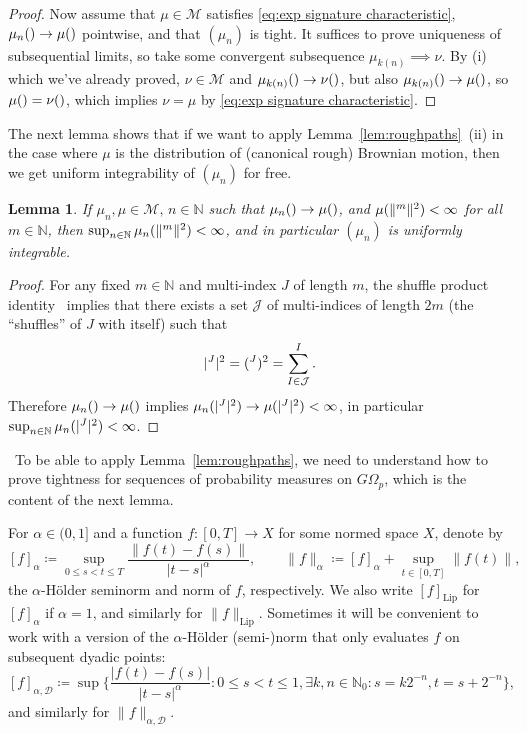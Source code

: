 \documentclass[11pt, letterpaper]{article}
\let\sig\relax
\DeclareMathOperator{\sig}{S}
\newtheorem{lemma}{Lemma}
\theoremstyle{definition}
\theoremstyle{remark}
\newcommand{\N}{\mathbb{N}}
\begin{document}
\begin{appendices}
\begin{proof}
    Now assume that $\mu\in \mathcal{M}$ satisfies \eqref{eq:exp signature characteristic}, $\mu_n(\sig) \to \mu(\sig)$ pointwise, and that $(\mu_n)$ is tight. It suffices to prove uniqueness of subsequential limits, so take some convergent subsequence $\mu_{k(n)} \implies \nu$. By (i) which we've already proved, $\nu\in \mathcal{M}$ and $\mu_{k(n)}(\sig) \to \nu(\sig)$, but also $\mu_{k(n)}(\sig) \to \mu(\sig)$, so $\mu(\sig) = \nu(\sig)$, which implies $\nu = \mu$ by \eqref{eq:exp signature characteristic}.
\end{proof}

The next lemma shows that if we want to apply Lemma~\ref{lem:roughpaths}~(ii) in the case where $\mu$ is the distribution of (canonical rough) Brownian motion, then we get uniform integrability of $(\mu_n)$ for free.
\begin{lemma}\label{lem: uniform integrability free}
    If $\mu_n,\mu \in \mathcal{M},\, n\in \N$ such that $\mu_n(\sig) \to \mu(\sig)$, and $\mu(\|\sig^m\|^2) < \infty$ for all $m\in \N$, then $\sup_{n\in \N} \mu_n(\|\sig^m\|^2) < \infty$, and in particular $(\mu_n)$ is uniformly integrable.
\end{lemma}
\begin{proof}
    For any fixed $m\in \N$ and multi-index $J$ of length $m$,
    the shuffle product identity~\cite[Theorem 2.15]{terrystflour} implies that there exists a set $\mathcal{J}$ of multi-indices of length $2m$ (the ``shuffles'' of $J$ with itself) such that \[
    |\sig^J|^2 = (\sig^J)^2 = \sum_{I \in \mathcal{J}} \sig^I.
    \] Therefore $\mu_n (\sig) \to \mu(\sig)$ implies $\mu_n(|\sig^J|^2) \to \mu(|\sig^J|^2) < \infty$, in particular $\sup_{n\in \N} \mu_n(|\sig^J|^2) < \infty$.
\end{proof}
\
To be able to apply Lemma~\ref{lem:roughpaths}, we need to understand how to prove tightness for sequences of probability measures on $G\Omega_p$, which is the content of the next lemma.

For $\alpha \in (0,1]$ and a function $f\colon [0,T] \to X$ for some normed space $X$, denote by \[
[f]_\alpha \coloneqq \sup_{0 \le s < t \le T} \frac{\|f(t) - f(s)\|}{|t-s|^\alpha},\qquad \|f\|_\alpha \coloneqq [f]_\alpha + \sup_{t\in [0,T]} \| f(t)\|,
\]
the $\alpha$-H\"older seminorm and norm of $f$, respectively. We also write $[f]_\text{Lip}$ for $[f]_\alpha$ if $\alpha = 1$, and similarly for $\|f\|_\text{Lip}$. Sometimes it will be convenient to work with a version of the $\alpha$-H\"older (semi-)norm that only evaluates $f$ on subsequent dyadic points: \[
    [f]_{\alpha,\mathcal{D}} \coloneqq \sup \bigg\{ \frac{|f(t)-f(s)|}{|t-s|^\alpha}\colon 0 \le s < t \le 1, \exists k,n\in \N_0\colon s = k2^{-n}, t=s+2^{-n} \bigg\},
\]
and similarly for $\|f\|_{\alpha,\mathcal{D}}$.


\end{appendices}
\end{document}
